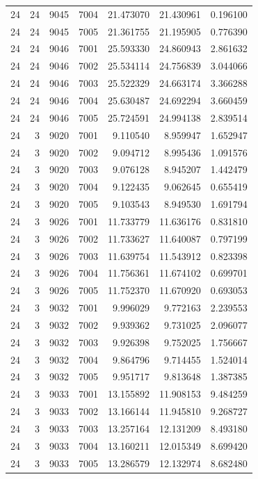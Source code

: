 \begin{table}
\begin{tabular}{rrrrrrr}
24 & 24 & 9045 & 7004 & 21.473070 & 21.430961 & 0.196100 \\
24 & 24 & 9045 & 7005 & 21.361755 & 21.195905 & 0.776390 \\
24 & 24 & 9046 & 7001 & 25.593330 & 24.860943 & 2.861632 \\
24 & 24 & 9046 & 7002 & 25.534114 & 24.756839 & 3.044066 \\
24 & 24 & 9046 & 7003 & 25.522329 & 24.663174 & 3.366288 \\
24 & 24 & 9046 & 7004 & 25.630487 & 24.692294 & 3.660459 \\
24 & 24 & 9046 & 7005 & 25.724591 & 24.994138 & 2.839514 \\
24 & 3 & 9020 & 7001 & 9.110540 & 8.959947 & 1.652947 \\
24 & 3 & 9020 & 7002 & 9.094712 & 8.995436 & 1.091576 \\
24 & 3 & 9020 & 7003 & 9.076128 & 8.945207 & 1.442479 \\
24 & 3 & 9020 & 7004 & 9.122435 & 9.062645 & 0.655419 \\
24 & 3 & 9020 & 7005 & 9.103543 & 8.949530 & 1.691794 \\
24 & 3 & 9026 & 7001 & 11.733779 & 11.636176 & 0.831810 \\
24 & 3 & 9026 & 7002 & 11.733627 & 11.640087 & 0.797199 \\
24 & 3 & 9026 & 7003 & 11.639754 & 11.543912 & 0.823398 \\
24 & 3 & 9026 & 7004 & 11.756361 & 11.674102 & 0.699701 \\
24 & 3 & 9026 & 7005 & 11.752370 & 11.670920 & 0.693053 \\
24 & 3 & 9032 & 7001 & 9.996029 & 9.772163 & 2.239553 \\
24 & 3 & 9032 & 7002 & 9.939362 & 9.731025 & 2.096077 \\
24 & 3 & 9032 & 7003 & 9.926398 & 9.752025 & 1.756667 \\
24 & 3 & 9032 & 7004 & 9.864796 & 9.714455 & 1.524014 \\
24 & 3 & 9032 & 7005 & 9.951717 & 9.813648 & 1.387385 \\
24 & 3 & 9033 & 7001 & 13.155892 & 11.908153 & 9.484259 \\
24 & 3 & 9033 & 7002 & 13.166144 & 11.945810 & 9.268727 \\
24 & 3 & 9033 & 7003 & 13.257164 & 12.131209 & 8.493180 \\
24 & 3 & 9033 & 7004 & 13.160211 & 12.015349 & 8.699420 \\
24 & 3 & 9033 & 7005 & 13.286579 & 12.132974 & 8.682480 \\

\end{tabular}
\end{table}
